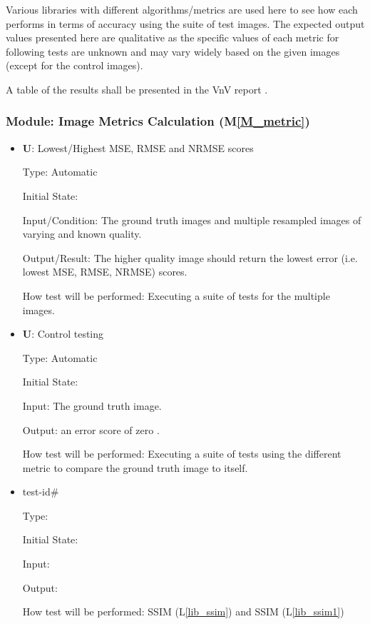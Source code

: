 \documentclass[12pt, titlepage]{article}
\newcommand{\mref}[1]{M\ref{#1}}
\newcounter{testnum} %
\newcounter{unittestnum} %
\newcommand{\lref}[1]{L\ref{#1}}
\newcommand{\lrefp}[1]{(\lref{#1})}
\begin{document}
Various libraries with different algorithms/metrics are used here to see how each
performs in terms of accuracy using the suite of test images.
The expected output values presented here are qualitative as the specific values
of each metric for following tests are unknown and may vary widely
based on the given images (except for the control images).

A table of the results shall be presented in the VnV report \cite{VnV_report}.

\subsubsection{Module: Image Metrics Calculation (\mref{M_metric})}

\begin{itemize}

\item{\textbf{U\theunittestnum \label{U_metric7}}: Lowest/Highest MSE, RMSE and NRMSE scores}

Type: Automatic

Initial State: 

Input/Condition: The ground truth images 
  and multiple resampled images of varying and known quality.

Output/Result: The higher quality image should return the lowest error (i.e. lowest MSE, RMSE, NRMSE) scores.

How test will be performed: Executing a suite of tests 
  for the multiple images.

\item{\textbf{U\theunittestnum \label{U_metricControl}}: Control testing}

Type: Automatic

Initial State: 

Input: The ground truth image.

Output: an error score of zero .

How test will be performed: Executing a suite of tests using the different metric to compare the 
ground truth image to itself.

\item{test-id\#\\}

Type: 

Initial State: 

Input: 

Output: 

How test will be performed: SSIM \lrefp{lib_ssim} and SSIM \lrefp{lib_ssim1}

\end{itemize}
\end{document}
